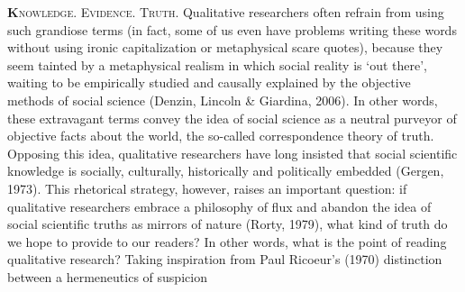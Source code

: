     \begin{adjmulticols}{2}{0mm}{0mm}
\lettrine[lines=2]{\bfseries\color{black}K}{nowledge. Evidence. Truth.} Qualitative researchers often refrain from using such grandiose terms (in fact, some of us even have problems writing these words without using ironic capitalization or metaphysical scare quotes), because they seem tainted by a metaphysical realism in which social reality is ‘out there’, waiting to be empirically studied and causally explained by the objective methods of social science (Denzin, Lincoln \& Giardina, 2006). In other words, these extravagant terms convey the idea of social science as a neutral purveyor of objective facts about the world, the so-called correspondence theory of truth. Opposing this idea, qualitative researchers have long insisted that social scientific knowledge is socially, culturally, historically and politically embedded (Gergen, 1973). This rhetorical strategy, however, raises an important question: if qualitative researchers embrace a philosophy of flux and abandon the idea of social scientific truths as mirrors of nature (Rorty, 1979), what kind of truth do we hope to provide to our readers? In other words, what is the point of reading qualitative research? Taking inspiration from Paul Ricoeur’s (1970) distinction between a hermeneutics of suspicion%

\end{adjmulticols}
